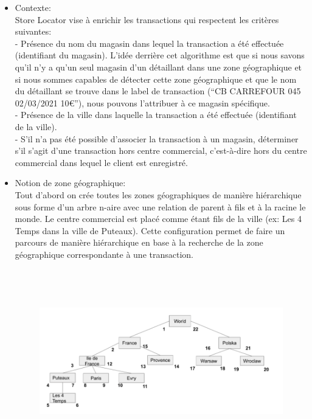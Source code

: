\begin{itemize}
\item Contexte:\\
Store Locator vise à enrichir les transactions qui respectent les critères suivantes:
\\
- Présence du nom du magasin dans lequel la transaction a été effectuée (identifiant du magasin). L'idée derrière cet algorithme est que si nous savons qu'il n'y a qu'un seul magasin d'un détaillant dans une zone géographique et si nous sommes capables de détecter cette zone géographique et que le nom du détaillant se trouve dans le label de transaction (“CB CARREFOUR 045 02/03/2021 10€”), nous pouvons l'attribuer à ce magasin spécifique.\\
- Présence de la ville dans laquelle la transaction a été effectuée (identifiant de la ville).\\
- S'il n'a pas été possible d'associer la transaction à un magasin, déterminer s'il s'agit d'une transaction hors centre commercial, c'est-à-dire hors du centre commercial dans lequel le client est enregistré.
\item Notion de zone géographique:\\
Tout d’abord on crée toutes les zones géographiques de manière hiérarchique sous forme d’un arbre n-aire avec une relation de parent à fils et à la racine le monde. Le centre commercial est placé comme étant fils de la ville  (ex: Les 4 Temps dans la ville de Puteaux). Cette configuration permet de faire un parcours de manière hiérarchique en base à la recherche de la zone géographique correspondante à une transaction.
\newpage
\begin{figure}[h]
\begin{center}
\includegraphics[width=15cm,height=8cm]{images/tree_geographical.png}

\end{center}
\end{figure}
\end{itemize}
